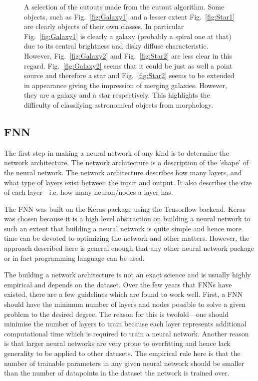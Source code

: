 \documentclass[a4paper,fleqn,usenatbib]{mnras}
\begin{document}
\begin{figure}
 \caption{A selection of the cutouts made from the cutout algorithm. Some objects, such as Fig.~\ref{fig:Galaxy1} and a lesser extent Fig.~\ref{fig:Star1} are clearly objects of their own classes. In particular Fig.~\ref{fig:Galaxy1} is clearly a galaxy (probably a spiral one at that) due to its central brightness and disky diffuse characteristic. However, Fig.~\ref{fig:Galaxy2} and Fig.~\ref{fig:Star2} are less clear in this regard. Fig.~\ref{fig:Galaxy2} seems that it could be just as well a point source and therefore a star and Fig.~\ref{fig:Star2} seems to be extended in appearance giving the impression of merging galaxies. However, they are a galaxy and a star respectively. This highlights the difficulty of classifying astronomical objects from morphology.}
 \label{fig:Examples}
 \end{figure}
 
\subsection{FNN}
The first step in making a neural network of any kind is to determine the network architecture. The network architecture is a description of the 'shape' of the neural network. The network architecture describes how many layers, and what type of layers exist between the input and output. It also describes the size of each layer---i.e. how many neuron/nodes a layer has. 

The FNN was built on the Keras package using the Tensorflow backend. Keras was chosen because it is a high level abstraction on building a neural network to such an extent that building a neural network is quite simple and hence more time can be devoted to optimizing the network and other matters. However, the approach described here is general enough that any other neural network package or in fact programming language can be used. 

The building a network architecture is not an exact science and is usually highly empirical and depends on the dataset. Over the few years that FNNs have existed, there are a few guidelines which are found to work well. First, a FNN should have the minimum number of layers and nodes possible to solve a given problem to the desired degree. The reason for this is twofold---one should minimise the number of layers to train because each layer represents additional computational time which is required to train a neural network. Another reason is that larger neural networks are very prone to overfitting and hence lack generality to be applied to other datasets. The empirical rule here is that the number of trainable parameters in any given neural network should be smaller than the number of datapoints in the dataset the network is trained over. 
\end{document}
